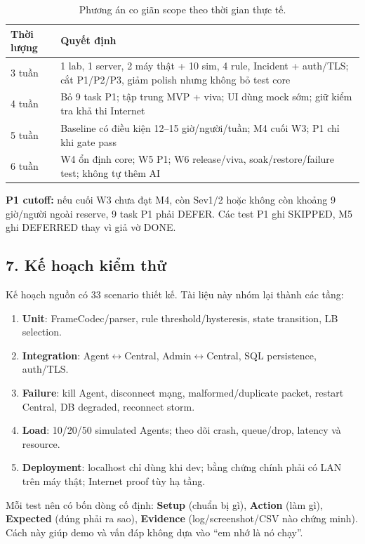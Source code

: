 \begin{table}[!ht]
\centering
\caption{Phương án co giãn scope theo thời gian thực tế.}
\small
\begin{tabularx}{\textwidth}{p{2cm} X}
\toprule
\textbf{Thời lượng} & \textbf{Quyết định} \\
\midrule
3 tuần & 1 lab, 1 server, 2 máy thật + 10 sim, 4 rule, Incident + auth/TLS; cắt P1/P2/P3, giảm polish nhưng không bỏ test core \\
4 tuần & Bỏ 9 task P1; tập trung MVP + viva; UI dùng mock sớm; giữ kiểm tra khả thi Internet \\
5 tuần & Baseline có điều kiện 12--15 giờ/người/tuần; M4 cuối W3; P1 chỉ khi gate pass \\
6 tuần & W4 ổn định core; W5 P1; W6 release/viva, soak/restore/failure test; không tự thêm AI \\
\bottomrule
\end{tabularx}
\end{table}

\textbf{P1 cutoff:} nếu cuối W3 chưa đạt M4, còn Sev1/2 hoặc không còn khoảng 9 giờ/người ngoài reserve, 9 task P1 phải DEFER. Các test P1 ghi SKIPPED, M5 ghi DEFERRED thay vì giả vờ DONE.

\subsection*{7. Kế hoạch kiểm thử}

Kế hoạch nguồn có 33 scenario thiết kế. Tài liệu này nhóm lại thành các tầng:
\begin{enumerate}
    \item \textbf{Unit}: FrameCodec/parser, rule threshold/hysteresis, state transition, LB selection.
    \item \textbf{Integration}: Agent$\leftrightarrow$Central, Admin$\leftrightarrow$Central, SQL persistence, auth/TLS.
    \item \textbf{Failure}: kill Agent, disconnect mạng, malformed/duplicate packet, restart Central, DB degraded, reconnect storm.
    \item \textbf{Load}: 10/20/50 simulated Agents; theo dõi crash, queue/drop, latency và resource.
    \item \textbf{Deployment}: localhost chỉ dùng khi dev; bằng chứng chính phải có LAN trên máy thật; Internet proof tùy hạ tầng.
\end{enumerate}

\begin{beginnerbox}
Mỗi test nên có bốn dòng cố định: \textbf{Setup} (chuẩn bị gì), \textbf{Action} (làm gì), \textbf{Expected} (đúng phải ra sao), \textbf{Evidence} (log/screenshot/CSV nào chứng minh). Cách này giúp demo và vấn đáp không dựa vào ``em nhớ là nó chạy''.
\end{beginnerbox}

